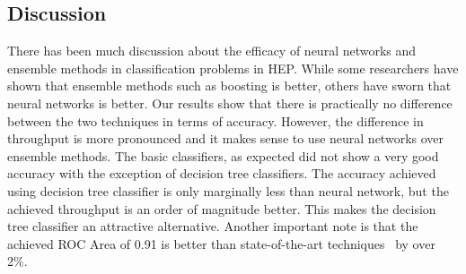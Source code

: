 
\subsection{Discussion}

There has been much discussion about the efficacy of neural networks and ensemble methods in classification problems in HEP. While some researchers have shown that ensemble methods such as boosting is better, others have sworn that neural networks is better. Our results show that there is practically no difference between the two techniques in terms of accuracy. However, the difference in throughput is more pronounced and it makes sense to use neural networks over ensemble methods. The basic classifiers, as expected  did not show a very good accuracy with the exception of decision tree classifiers. The accuracy achieved using decision tree classifier is only marginally less than neural network, but the achieved throughput is an order of magnitude better. This makes the decision tree classifier an attractive alternative. Another important note is that the achieved ROC Area of 0.91 is better than state-of-the-art techniques~\cite{DeepNN} by over 2\%.

